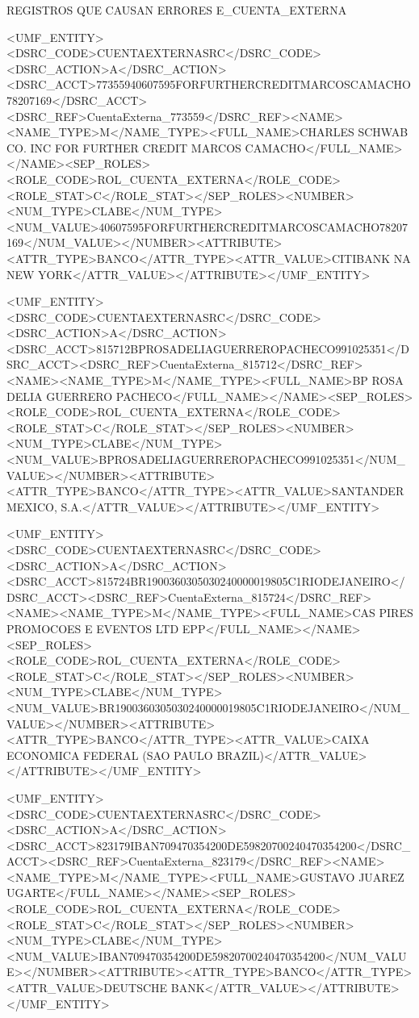 



REGISTROS QUE CAUSAN ERRORES E_CUENTA_EXTERNA






 
 <UMF_ENTITY><DSRC_CODE>CUENTAEXTERNASRC</DSRC_CODE><DSRC_ACTION>A</DSRC_ACTION><DSRC_ACCT>77355940607595FORFURTHERCREDITMARCOSCAMACHO78207169</DSRC_ACCT><DSRC_REF>CuentaExterna_773559</DSRC_REF><NAME><NAME_TYPE>M</NAME_TYPE><FULL_NAME>CHARLES SCHWAB CO. INC FOR FURTHER CREDIT MARCOS CAMACHO</FULL_NAME></NAME><SEP_ROLES><ROLE_CODE>ROL_CUENTA_EXTERNA</ROLE_CODE><ROLE_STAT>C</ROLE_STAT></SEP_ROLES><NUMBER><NUM_TYPE>CLABE</NUM_TYPE><NUM_VALUE>40607595FORFURTHERCREDITMARCOSCAMACHO78207169</NUM_VALUE></NUMBER><ATTRIBUTE><ATTR_TYPE>BANCO</ATTR_TYPE><ATTR_VALUE>CITIBANK NA NEW YORK</ATTR_VALUE></ATTRIBUTE></UMF_ENTITY>
 
 <UMF_ENTITY><DSRC_CODE>CUENTAEXTERNASRC</DSRC_CODE><DSRC_ACTION>A</DSRC_ACTION><DSRC_ACCT>815712BPROSADELIAGUERREROPACHECO991025351</DSRC_ACCT><DSRC_REF>CuentaExterna_815712</DSRC_REF><NAME><NAME_TYPE>M</NAME_TYPE><FULL_NAME>BP ROSA DELIA GUERRERO PACHECO</FULL_NAME></NAME><SEP_ROLES><ROLE_CODE>ROL_CUENTA_EXTERNA</ROLE_CODE><ROLE_STAT>C</ROLE_STAT></SEP_ROLES><NUMBER><NUM_TYPE>CLABE</NUM_TYPE><NUM_VALUE>BPROSADELIAGUERREROPACHECO991025351</NUM_VALUE></NUMBER><ATTRIBUTE><ATTR_TYPE>BANCO</ATTR_TYPE><ATTR_VALUE>SANTANDER MEXICO, S.A.</ATTR_VALUE></ATTRIBUTE></UMF_ENTITY>
 
 
 <UMF_ENTITY><DSRC_CODE>CUENTAEXTERNASRC</DSRC_CODE><DSRC_ACTION>A</DSRC_ACTION><DSRC_ACCT>815724BR1900360305030240000019805C1RIODEJANEIRO</DSRC_ACCT><DSRC_REF>CuentaExterna_815724</DSRC_REF><NAME><NAME_TYPE>M</NAME_TYPE><FULL_NAME>CAS PIRES PROMOCOES E EVENTOS LTD EPP</FULL_NAME></NAME><SEP_ROLES><ROLE_CODE>ROL_CUENTA_EXTERNA</ROLE_CODE><ROLE_STAT>C</ROLE_STAT></SEP_ROLES><NUMBER><NUM_TYPE>CLABE</NUM_TYPE><NUM_VALUE>BR1900360305030240000019805C1RIODEJANEIRO</NUM_VALUE></NUMBER><ATTRIBUTE><ATTR_TYPE>BANCO</ATTR_TYPE><ATTR_VALUE>CAIXA ECONOMICA FEDERAL (SAO PAULO BRAZIL)</ATTR_VALUE></ATTRIBUTE></UMF_ENTITY>
 
 
 
 <UMF_ENTITY><DSRC_CODE>CUENTAEXTERNASRC</DSRC_CODE><DSRC_ACTION>A</DSRC_ACTION><DSRC_ACCT>823179IBAN709470354200DE59820700240470354200</DSRC_ACCT><DSRC_REF>CuentaExterna_823179</DSRC_REF><NAME><NAME_TYPE>M</NAME_TYPE><FULL_NAME>GUSTAVO JUAREZ UGARTE</FULL_NAME></NAME><SEP_ROLES><ROLE_CODE>ROL_CUENTA_EXTERNA</ROLE_CODE><ROLE_STAT>C</ROLE_STAT></SEP_ROLES><NUMBER><NUM_TYPE>CLABE</NUM_TYPE><NUM_VALUE>IBAN709470354200DE59820700240470354200</NUM_VALUE></NUMBER><ATTRIBUTE><ATTR_TYPE>BANCO</ATTR_TYPE><ATTR_VALUE>DEUTSCHE BANK</ATTR_VALUE></ATTRIBUTE></UMF_ENTITY>
 
 